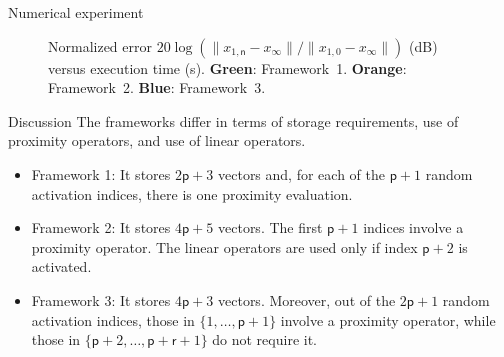 \documentclass[%
compress]{beamer}
\newcommand{\nS}{{\mathsf{n}}}
\newcommand{\tdred}[1]{{\color{dred}#1}}
\newcommand{\tdgreen}[1]{{\color{dgreen}#1}}
\begin{document}
\begin{frame}{Numerical experiment}
\begin{figure}[ht!]
\caption{
\justifying
Normalized error $20\log(\|x_{1,\nS}-x_\infty\|/
\|x_{1,0}-x_\infty\|)$ (dB) versus execution time (s).
{\bf\color{dgreen} Green}: Framework~1.
{\bf\color{orng} Orange}: Framework~2. 
{\bf\color{dblue} Blue}: Framework~3.
}
\label{fig:ex1}
\end{figure}
\end{frame}


\begin{frame}{Discussion}
\justifying
The frameworks differ in terms of storage
requirements, use of \tdgreen{proximity} operators, and use of 
\tdred{linear} operators.
\begin{itemize}
\justifying
\item\pause
Framework 1: It stores $2\mathsf{p}+3$ vectors and, for each of 
the $\mathsf{p}+1$ random activation indices, there is one
\tdgreen{proximity} evaluation.
\item\pause
Framework 2: It stores $4\mathsf{p}+5$ vectors. The first 
$\mathsf{p}+1$ indices involve a \tdgreen{proximity} operator.
The \tdred{linear} operators are used only if index 
$\mathsf{p}+2$ is activated.
\item\pause
Framework 3: It stores $4\mathsf{p}+3$ vectors. 
Moreover, out of the $2\mathsf{p}+1$ random activation 
indices, those in $\{1,\ldots,\mathsf{p}+1\}$ involve a
\tdgreen{proximity} operator, while those in 
$\{\mathsf{p}+2,\ldots,\mathsf{p}+\mathsf{r}+1\}$
do not require it. 
\end{itemize}
\end{frame}
\end{document}
